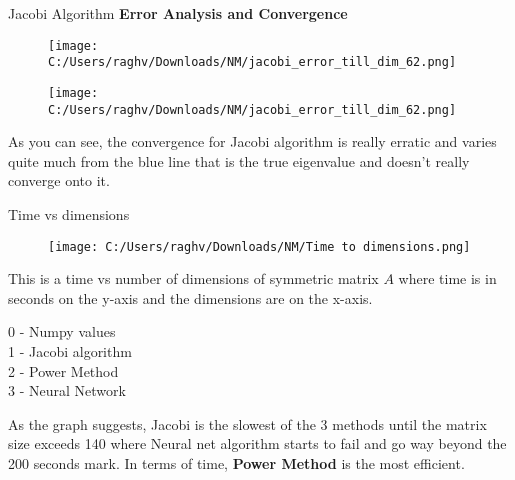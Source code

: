 \documentclass[13.5pt, aspectratio=169]{beamer}
\begin{document}
\begin{frame}{Jacobi Algorithm}
    \large \textbf{Error Analysis and Convergence}

    \begin{figure}[h]
        \centering
        \texttt{[image: C:/Users/raghv/Downloads/NM/jacobi\_error\_till\_dim\_62.png]}
        \label{fig:image2}
    \end{figure}
\end{frame}

\begin{frame}

    \begin{figure}[h]
        \centering
        \texttt{[image: C:/Users/raghv/Downloads/NM/jacobi\_error\_till\_dim\_62.png]}
        \label{fig:image2}
    \end{figure}

    As you can see, the convergence for Jacobi algorithm is really erratic and varies quite much from the blue line that is the true eigenvalue and doesn't really converge onto it. 
    
\end{frame}

\begin{frame}{Time vs dimensions}

    \begin{figure}[h]
        \centering
        \texttt{[image: C:/Users/raghv/Downloads/NM/Time to dimensions.png]}
        \label{fig:image2}
      \end{figure}
\end{frame}

\begin{frame}
    This is a time vs number of dimensions of symmetric matrix $A$ where time is in seconds on the y-axis and the dimensions are on the x-axis.
    \\
    \begin{center}
        0 - Numpy values \\
        1 - Jacobi algorithm \\
        2 - Power Method \\
        3 - Neural Network \\
    \end{center}

    As the graph suggests, Jacobi is the slowest of the 3 methods until the matrix size exceeds 140 where Neural net algorithm starts to fail and go way beyond the 200 seconds mark. In terms of time, \large \textbf{Power Method} \normalsize is the most efficient.
\end{frame}
\end{document}
